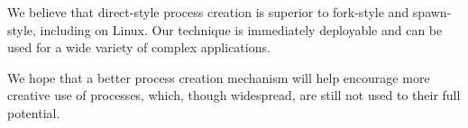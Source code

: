 \documentclass[letterpaper,twocolumn,10pt]{article}
\begin{document}
We believe that direct-style process creation is superior to fork-style and spawn-style,
including on Linux.
Our technique is immediately deployable and can be used for a wide variety of complex applications.

We hope that a better process creation mechanism
will help encourage more creative use of processes,
which, though widespread,
are still not used to their full potential.



\end{document}

